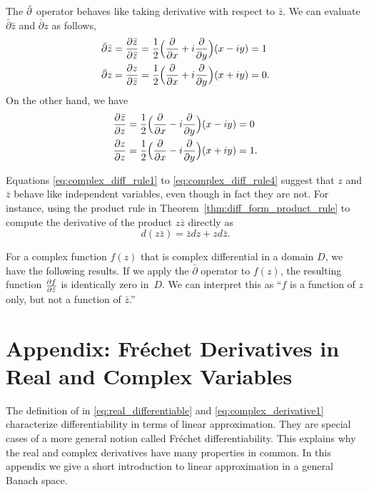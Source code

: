 The $\bar{\partial}$ operator behaves like taking derivative with respect to $\bar{z}$. We can evaluate $\bar{\partial} \bar{z}$ and $\bar{\partial} z$ as follows,
\begin{align}
	\bar{\partial} \bar{z} &= \frac{\partial \bar{z} }{\partial \bar{z}} =
	\frac{1}{2} \Big( \frac{\partial }{\partial x} + i \frac{\partial }{\partial y}\Big) (x-iy) = 1 \label{eq:complex_diff_rule1}\\
	\bar{\partial} z& = \frac{\partial z }{\partial \bar{z}} =
	\frac{1}{2} \Big( \frac{\partial }{\partial x} + i \frac{\partial }{\partial y}\Big) (x+iy) = 0. \label{eq:complex_diff_rule2}	 
\end{align}
On the other hand, we have 
\begin{align}
	\frac{\partial \bar{z} }{\partial {z}} & =
	\frac{1}{2} \Big( \frac{\partial }{\partial x} - i \frac{\partial }{\partial y}\Big) (x-iy) = 0 \label{eq:complex_diff_rule3}\\
	\frac{\partial z }{\partial {z}} &=
	\frac{1}{2} \Big( \frac{\partial }{\partial x} - i \frac{\partial }{\partial y}\Big) (x+iy) = 1.	 \label{eq:complex_diff_rule4}
\end{align}

Equations \eqref{eq:complex_diff_rule1} to \eqref{eq:complex_diff_rule4} suggest that $z$ and $\bar{z}$ behave like independent variables, even though in fact they are not. For instance, using the product rule in Theorem~\ref{thm:diff_form_product_rule} to compute the derivative of the product $z \bar{z}$ directly as
$$
d( z \bar{z}) =  \bar{z} dz + z d\bar{z}.
$$



For a complex function $f(z)$ that is complex differential in a domain $D$, we have the following results. If we apply the $\bar{\partial}$ operator to $f(z)$, the resulting function $\frac{\partial f}{\partial \bar{z}}$ is identically zero in~$D$. We can interpret this as ``$f$ is a function of $z$ only, but not a function of $\bar{z}$.'' 







\section{Appendix: Fréchet Derivatives in Real and Complex Variables}

The definition of in \eqref{eq:real_differentiable} and \eqref{eq:complex_derivative1} characterize differentiability in terms of linear approximation. They are special cases of a more general notion called Fr\'echet differentiability. This explains why the real and complex derivatives have many properties in common. In this appendix we give a short introduction to linear approximation in a general Banach space.

